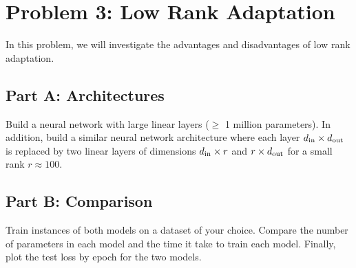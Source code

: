 \documentclass{article}
\begin{document}
%

\newpage
\section*{Problem 3: Low Rank Adaptation}

In this problem, we will investigate the advantages and disadvantages of low rank adaptation.

\subsection*{Part A: Architectures}

Build a neural network with large linear layers ($\geq$ 1 million parameters).
In addition, build a similar neural network architecture where each layer $d_\textnormal{in} \times d_\textnormal{out}$ is replaced by two linear layers of dimensions $d_\textnormal{in} \times r$ and $r \times d_\textnormal{out}$ for a small rank $r \approx 100$.

\subsection*{Part B: Comparison}

Train instances of both models on a dataset of your choice.
Compare the number of parameters in each model and the time it take to train each model.
Finally, plot the test loss by epoch for the two models.

%
\end{document}

